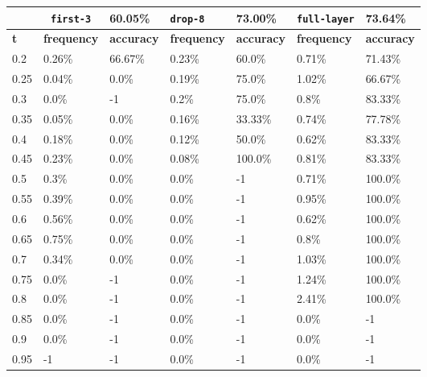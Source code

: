 
\begin{table}[t]
\centering
\begin{tabular}{lllllll} %
\hline

\multicolumn{1}{c}{}& 
\multicolumn{1}{c}{\texttt{first-3}} & \multicolumn{1}{l|}{60.05\%} 
& \multicolumn{1}{l}{\texttt{drop-8}} & \multicolumn{1}{l|}{73.00\%}
& \multicolumn{1}{l}{\texttt{full-layer}} & 73.64\%
\\ \hline
\multicolumn{1}{l|}{\textbf{t}} &
\multicolumn{1}{l|}{\textbf{frequency}} & 
\multicolumn{1}{l|}{\textbf{accuracy}} & 
\multicolumn{1}{l|}{\textbf{frequency}} & 
\multicolumn{1}{l|}{\textbf{accuracy}} & 
\multicolumn{1}{l|}{\textbf{frequency}} & 
\multicolumn{1}{l|}{\textbf{accuracy}} \\ \hline
	\multicolumn{1}{l|}{0.2}&  0.26\% & \multicolumn{1}{l|}{66.67\%}& 0.23\% & \multicolumn{1}{l|}{60.0\%}& 0.71\% & 71.43\%\\ 
\multicolumn{1}{l|}{0.25}&  0.04\% & \multicolumn{1}{l|}{0.0\%}& 0.19\% & \multicolumn{1}{l|}{75.0\%}& 1.02\% & 66.67\%\\ 
\multicolumn{1}{l|}{0.3}&  0.0\% & \multicolumn{1}{l|}{-1}& 0.2\% & \multicolumn{1}{l|}{75.0\%}& 0.8\% & 83.33\%\\ 
\multicolumn{1}{l|}{0.35}&  0.05\% & \multicolumn{1}{l|}{0.0\%}& 0.16\% & \multicolumn{1}{l|}{33.33\%}& 0.74\% & 77.78\%\\ 
\multicolumn{1}{l|}{0.4}&  0.18\% & \multicolumn{1}{l|}{0.0\%}& 0.12\% & \multicolumn{1}{l|}{50.0\%}& 0.62\% & 83.33\%\\ 
\multicolumn{1}{l|}{0.45}&  0.23\% & \multicolumn{1}{l|}{0.0\%}& 0.08\% & \multicolumn{1}{l|}{100.0\%}& 0.81\% & 83.33\%\\ 
\multicolumn{1}{l|}{0.5}&  0.3\% & \multicolumn{1}{l|}{0.0\%}& 0.0\% & \multicolumn{1}{l|}{-1}& 0.71\% & 100.0\%\\ 
\multicolumn{1}{l|}{0.55}&  0.39\% & \multicolumn{1}{l|}{0.0\%}& 0.0\% & \multicolumn{1}{l|}{-1}& 0.95\% & 100.0\%\\ 
\multicolumn{1}{l|}{0.6}&  0.56\% & \multicolumn{1}{l|}{0.0\%}& 0.0\% & \multicolumn{1}{l|}{-1}& 0.62\% & 100.0\%\\ 
\multicolumn{1}{l|}{0.65}&  0.75\% & \multicolumn{1}{l|}{0.0\%}& 0.0\% & \multicolumn{1}{l|}{-1}& 0.8\% & 100.0\%\\ 
\multicolumn{1}{l|}{0.7}&  0.34\% & \multicolumn{1}{l|}{0.0\%}& 0.0\% & \multicolumn{1}{l|}{-1}& 1.03\% & 100.0\%\\ 
\multicolumn{1}{l|}{0.75}&  0.0\% & \multicolumn{1}{l|}{-1}& 0.0\% & \multicolumn{1}{l|}{-1}& 1.24\% & 100.0\%\\ 
\multicolumn{1}{l|}{0.8}&  0.0\% & \multicolumn{1}{l|}{-1}& 0.0\% & \multicolumn{1}{l|}{-1}& 2.41\% & 100.0\%\\ 
\multicolumn{1}{l|}{0.85}&  0.0\% & \multicolumn{1}{l|}{-1}& 0.0\% & \multicolumn{1}{l|}{-1}& 0.0\% & -1\\ 
\multicolumn{1}{l|}{0.9}&  0.0\% & \multicolumn{1}{l|}{-1}& 0.0\% & \multicolumn{1}{l|}{-1}& 0.0\% & -1\\ 
\multicolumn{1}{l|}{0.95}&  -1 & \multicolumn{1}{l|}{-1}& 0.0\% & \multicolumn{1}{l|}{-1}& 0.0\% & -1\\ 


\end{tabular}
\end{table}
